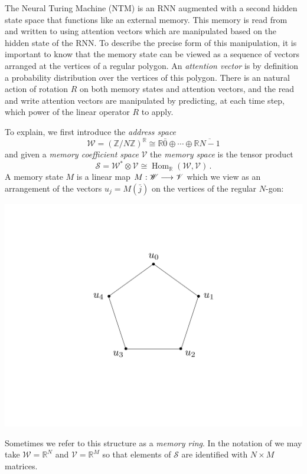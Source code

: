 \documentclass[english,letter paper,12pt,leqno]{article}
\theoremstyle{example}
\numberwithin{equation}{section}
\def\Hom{\operatorname{Hom}}
\begin{document}
The Neural Turing Machine (NTM) \cite{ntm} is an RNN augmented with a second hidden state space that functions like an external memory. This memory is read from and written to using attention vectors which are manipulated based on the hidden state of the RNN. To describe the precise form of this manipulation, it is important to know that the memory state can be viewed as a sequence of vectors arranged at the vertices of a regular polygon. An \emph{attention vector} is by definition a probability distribution over the vertices of this polygon. There is an natural action of rotation $R$ on both memory states and attention vectors, and the read and write attention vectors are manipulated by predicting, at each time step, which power of the linear operator $R$ to apply. %

To explain, we first introduce the \emph{address space}
\[
\mathscr{W} = (\mathbb{Z}/N\mathbb{Z})^{\mathbb{R}} \cong \mathbb{R} \bar{0} \oplus \cdots \oplus \mathbb{R} \overline{N-1}
\]
and given a \emph{memory coefficient space} $\mathscr{V}$ the \emph{memory space} is the tensor product
\[
\mathscr{S} = \mathscr{W}^* \otimes \mathscr{V} \cong \Hom_{\mathbb{R}}(\mathscr{W}, \mathscr{V})\,.
\]
A memory state $M$ is a linear map $M: \mathscr{W} \longrightarrow \mathscr{V}$ which we view as an arrangement of the vectors $u_j = M(\bar{j})$ on the vertices of the regular $N$-gon:
\begin{center}
\includegraphics[scale=0.3]{dia1}
\end{center}
Sometimes we refer to this structure as a \emph{memory ring}. In the notation of \cite{ntm} we may take $\mathscr{W} = \mathbb{R}^N$ and $\mathscr{V} = \mathbb{R}^M$ so that elements of $\mathscr{S}$ are identified with $N \times M$ matrices. 
\end{document}
